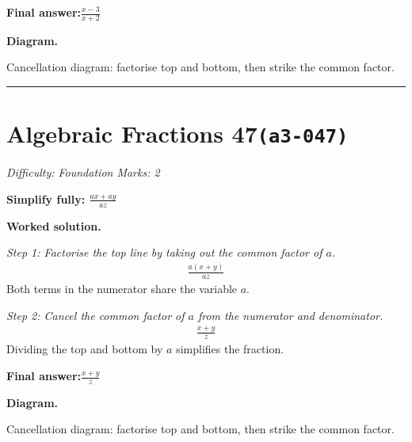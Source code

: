 \documentclass[11pt]{article}
\newcommand{\question}[1]{\par\medskip\noindent\textbf{#1}\par}
\begin{document}
\begin{answerbox}
\textbf{Final answer:}\quad \(\displaystyle \frac{x-3}{x+2}\)
\end{answerbox}
\textbf{Diagram.}

\begin{center}
\end{center}
\small Cancellation diagram: factorise top and bottom, then strike the common factor.\normalsize

\medskip\hrule

\section*{Algebraic Fractions 47\quad\small\texttt{(a3-047)}}
\textit{Difficulty: Foundation \quad\textbar\quad Marks: 2}

\question{Simplify fully: \( \frac{ax+ay}{az} \)}

\textbf{Worked solution.}

\textit{Step 1: Factorise the top line by taking out the common factor of \( a \).}
\[\begin{gathered}
\frac{a(x+y)}{az}
\end{gathered}\]
Both terms in the numerator share the variable \( a \).

\textit{Step 2: Cancel the common factor of \( a \) from the numerator and denominator.}
\[\begin{gathered}
\frac{x+y}{z}
\end{gathered}\]
Dividing the top and bottom by \( a \) simplifies the fraction.

\begin{answerbox}
\textbf{Final answer:}\quad \(\displaystyle \frac{x+y}{z}\)
\end{answerbox}
\textbf{Diagram.}

\begin{center}
\end{center}
\small Cancellation diagram: factorise top and bottom, then strike the common factor.\normalsize
\end{document}
